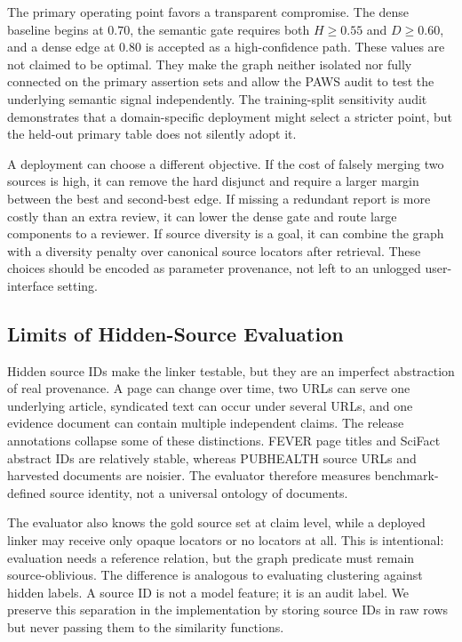 \documentclass{ieeeaccess}
\begin{document}
The primary operating point favors a transparent compromise. The dense baseline begins at $0.70$, the semantic gate requires both $H\geq0.55$ and $D\geq0.60$, and a dense edge at $0.80$ is accepted as a high-confidence path. These values are not claimed to be optimal. They make the graph neither isolated nor fully connected on the primary assertion sets and allow the PAWS audit to test the underlying semantic signal independently. The training-split sensitivity audit demonstrates that a domain-specific deployment might select a stricter point, but the held-out primary table does not silently adopt it.

A deployment can choose a different objective. If the cost of falsely merging two sources is high, it can remove the hard disjunct and require a larger margin between the best and second-best edge. If missing a redundant report is more costly than an extra review, it can lower the dense gate and route large components to a reviewer. If source diversity is a goal, it can combine the graph with a diversity penalty over canonical source locators after retrieval. These choices should be encoded as parameter provenance, not left to an unlogged user-interface setting.

\subsection{Limits of Hidden-Source Evaluation}
Hidden source IDs make the linker testable, but they are an imperfect abstraction of real provenance. A page can change over time, two URLs can serve one underlying article, syndicated text can occur under several URLs, and one evidence document can contain multiple independent claims. The release annotations collapse some of these distinctions. FEVER page titles and SciFact abstract IDs are relatively stable, whereas PUBHEALTH source URLs and harvested documents are noisier. The evaluator therefore measures benchmark-defined source identity, not a universal ontology of documents.

The evaluator also knows the gold source set at claim level, while a deployed linker may receive only opaque locators or no locators at all. This is intentional: evaluation needs a reference relation, but the graph predicate must remain source-oblivious. The difference is analogous to evaluating clustering against hidden labels. A source ID is not a model feature; it is an audit label. We preserve this separation in the implementation by storing source IDs in raw rows but never passing them to the similarity functions.
\end{document}
